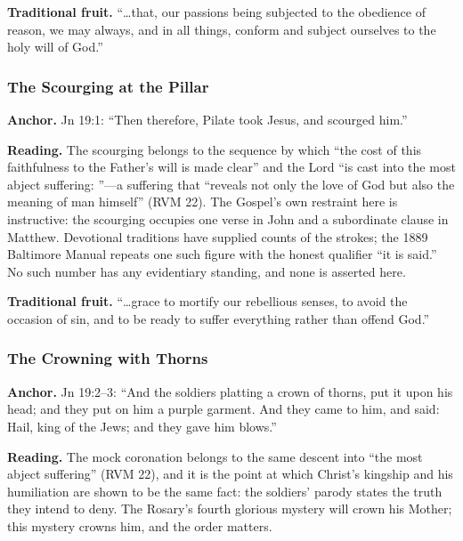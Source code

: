 \textbf{Traditional fruit.} ``\ldots that, our passions being subjected
to the obedience of reason, we may always, and in all things, conform
and subject ourselves to the holy will of God.''

\subsubsection{The Scourging at the Pillar}

\textbf{Anchor.} Jn 19:1: ``Then therefore, Pilate took Jesus, and
scourged him.''

\textbf{Reading.} The scourging belongs to the sequence by which ``the
cost of this faithfulness to the Father's will is made clear'' and the
Lord ``is cast into the most abject suffering: ''---a
suffering that ``reveals not only the love of God but also the meaning
of man himself'' (RVM 22). The Gospel's own restraint here is
instructive: the scourging occupies one verse in John and a subordinate
clause in Matthew. Devotional traditions have supplied counts of the
strokes; the 1889 Baltimore Manual repeats one such figure with the
honest qualifier ``it is said.'' No such number has any evidentiary
standing, and none is asserted here.

\textbf{Traditional fruit.} ``\ldots grace to mortify our rebellious
senses, to avoid the occasion of sin, and to be ready to suffer
everything rather than offend God.''

\subsubsection{The Crowning with Thorns}

\textbf{Anchor.} Jn 19:2--3: ``And the soldiers platting a crown of
thorns, put it upon his head; and they put on him a purple garment. And
they came to him, and said: Hail, king of the Jews; and they gave him
blows.''

\textbf{Reading.} The mock coronation belongs to the same descent into
``the most abject suffering'' (RVM 22), and it is the point at which
Christ's kingship and his humiliation are shown to be the same fact: the
soldiers' parody states the truth they intend to deny. The Rosary's
fourth glorious mystery will crown his Mother; this mystery crowns him,
and the order matters.

